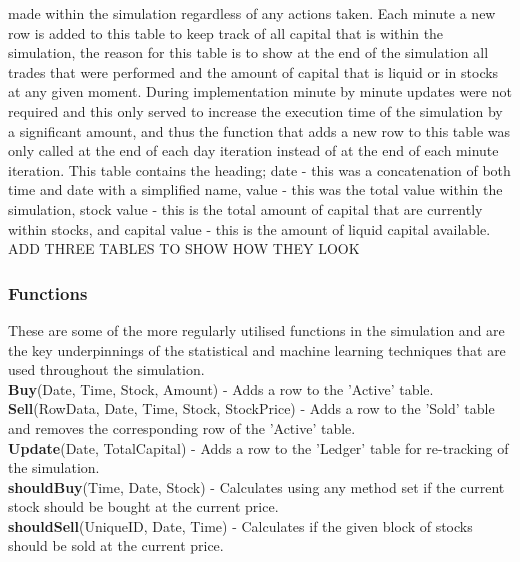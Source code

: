 \documentclass[12pt,a4paper]{article}
\begin{document}
made within the simulation regardless of any actions taken. Each minute a new row is added to this table to keep track of all capital that is within the simulation, the reason for this table is to show at the end of the simulation all trades that were performed and the amount of capital that is liquid or in stocks at any given moment. During implementation minute by minute updates were not required and this only served to increase the execution time of the simulation by a significant amount, and thus the function that adds a new row to this table was only called at the end of each day iteration instead of at the end of each minute iteration. This table contains the heading; date - this was a concatenation of both time and date with a simplified name, value - this was the total value within the simulation, stock value - this is the total amount of capital that are currently within stocks, and capital value - this is the amount of liquid capital available. \\

ADD THREE TABLES TO SHOW HOW THEY LOOK\\
\fi

\subsubsection*{Functions}

These are some of the more regularly utilised functions in the simulation and are the key underpinnings of the statistical and machine learning techniques that are used throughout the simulation. \\

\noindent
\textbf{Buy}(Date, Time, Stock, Amount) - Adds a row to the 'Active' table. \\

\noindent
\textbf{Sell}(RowData, Date, Time, Stock, StockPrice) - Adds a row to the 'Sold' table and removes the corresponding row of the 'Active' table.\\

\noindent
\textbf{Update}(Date, TotalCapital) - Adds a row to the 'Ledger' table for re-tracking of the simulation.\\

\noindent
\textbf{shouldBuy}(Time, Date, Stock) - Calculates using any method set if the current stock should be bought at the current price.\\

\noindent
\textbf{shouldSell}(UniqueID, Date, Time) - Calculates if the given block of stocks should be sold at the current price.\\
\end{document}
